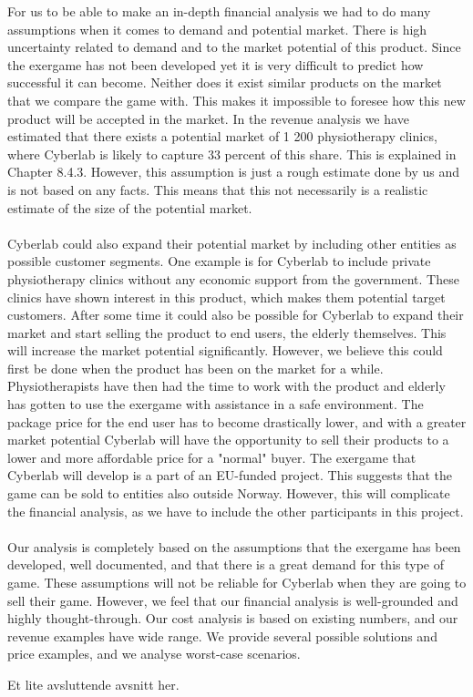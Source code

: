 For us to be able to make an in-depth financial analysis we had to do many assumptions when it comes to demand and potential market. There is high uncertainty related to demand and to the market potential of this product. Since the exergame has not been developed yet it is very difficult to predict how successful it can become. Neither does it exist similar products on the market that we compare the game with. This makes it impossible to foresee how this new product will be accepted in the market. In the revenue analysis we have estimated that there exists a potential market of 1 200 physiotherapy clinics, where Cyberlab is likely to capture 33 percent of this share. This is explained in Chapter 8.4.3. However, this assumption is just a rough estimate done by us and is not based on any facts. This means that this not necessarily is a realistic estimate of the size of the potential market. \\ \\
Cyberlab could also expand their potential market by including other entities as possible customer segments. One example is for Cyberlab to include private physiotherapy clinics without any economic support from the government. These clinics have shown interest in this product, which makes them potential target customers.  After some time it could also be possible for Cyberlab to expand their market and start selling the product to end users, the elderly themselves. This will increase the market potential significantly. However, we believe this could first be done when the product has been on the market for a while. Physiotherapists have then had the time to work with the product and elderly has gotten to use the exergame with assistance in a safe environment. The package price for the end user has to become drastically lower, and with a greater market potential Cyberlab will have the opportunity to sell their products to a lower and more affordable price for a "normal" buyer. The exergame that Cyberlab will develop is a part of an EU-funded project. This suggests that the game can be sold to entities also outside Norway. However, this will complicate the financial analysis, as we have to include the other participants in this project. \\ \\
Our analysis is completely based on the assumptions that the exergame has been developed, well documented, and that there is a great demand for this type of game. These assumptions will not be reliable for Cyberlab when they are going to sell their game. However, we feel that our financial analysis is well-grounded and highly thought-through. Our cost analysis is based on existing numbers, and our revenue examples have wide range. We provide several possible solutions and price examples, and we analyse worst-case scenarios.  

Et lite avsluttende avsnitt her.


